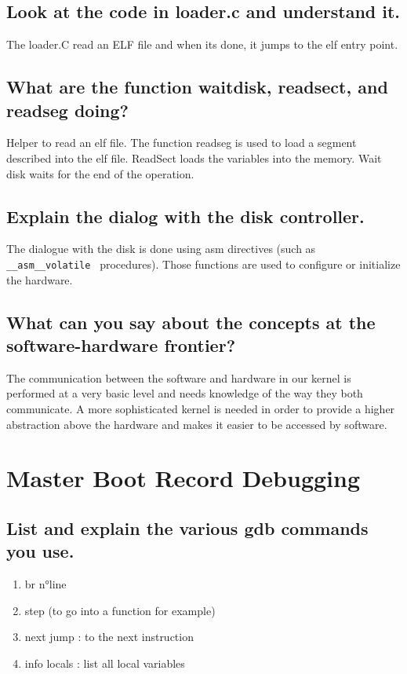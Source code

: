 \documentclass[10]{article}
\begin{document}
\subsection{Look at the code in loader.c and understand it.}
The loader.C read an ELF file and when its done, it jumps to the elf entry point.
\subsection{What are the function waitdisk, readsect, and readseg doing?}
Helper to read an elf file. The function readseg is used to load a segment described into the elf file. ReadSect loads the variables into the memory.
Wait disk waits for the end of the operation.
\subsection{Explain the dialog with the disk controller.}
The dialogue with the disk is done using asm directives (such as \texttt{ \_\_asm\_\_volatile } procedures).
Those functions are used to configure or initialize the hardware.
\subsection{What can you say about the concepts at the software-hardware frontier?}

The communication between the software and hardware in our kernel is performed at a very basic level and needs knowledge of the way they both communicate. A more sophisticated kernel is needed in order to provide a higher abstraction above the hardware and makes it easier to be accessed by software.


\section{Master Boot Record Debugging}

\subsection{List and explain the various gdb commands you use.}
\begin{enumerate}
	\item br n°line 
	\item step (to go into a function for example)
	\item next jump : to the next instruction
	\item info locals : list all local variables
\end{enumerate}
\end{document}
